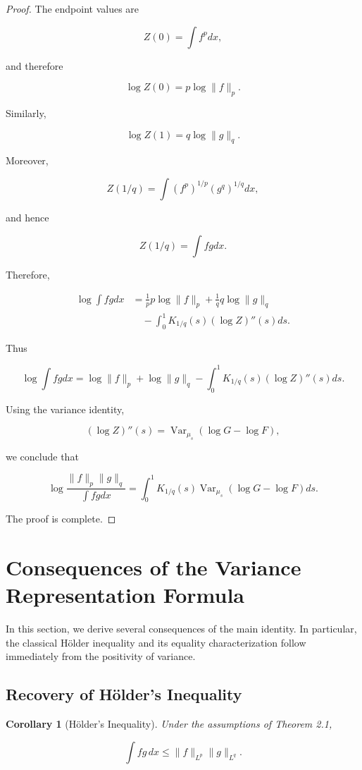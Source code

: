 \documentclass[11pt]{amsart}
\newtheorem{corollary}[theorem]{Corollary}
\begin{document}
\begin{proof}
The endpoint values are

\[
Z(0)
=
\int f^p dx ,
\]

and therefore

\[
\log Z(0)
=
p\log\|f\|_p .
\]

Similarly,

\[
\log Z(1)
=
q\log\|g\|_q .
\]

Moreover,

\[
Z(1/q)
=
\int
(f^p)^{1/p}
(g^q)^{1/q}dx ,
\]

and hence

\[
Z(1/q)
=
\int fg dx .
\]


Therefore,

\[
\begin{aligned}
\log\int fg dx
&=
\frac1p
p\log\|f\|_p
+
\frac1q
q\log\|g\|_q
\\
&\quad
-
\int_0^1
K_{1/q}(s)
(\log Z)''(s)ds .
\end{aligned}
\]

Thus

\[
\log\int fg dx
=
\log\|f\|_p
+
\log\|g\|_q
-
\int_0^1
K_{1/q}(s)
(\log Z)''(s)ds .
\]

Using the variance identity,

\[
(\log Z)''(s)
=
\operatorname{Var}_{\mu_s}
(
\log G-\log F
),
\]

we conclude that

\[
\log
\frac{
\|f\|_p\|g\|_q
}{
\int fg dx
}
=
\int_0^1
K_{1/q}(s)
\operatorname{Var}_{\mu_s}
(
\log G-\log F
)
ds .
\]

The proof is complete.

\end{proof}


\section{Consequences of the Variance Representation Formula}


In this section, we derive several consequences of the main
identity. In particular, the classical Hölder inequality and its
equality characterization follow immediately from the positivity of
variance.


\subsection{Recovery of Hölder's Inequality}


\begin{corollary}[Hölder's Inequality]
Under the assumptions of Theorem 2.1,

\[
\int fg\,dx
\leq
\|f\|_{L^p}
\|g\|_{L^q}.
\]

\end{corollary}
\end{document}
